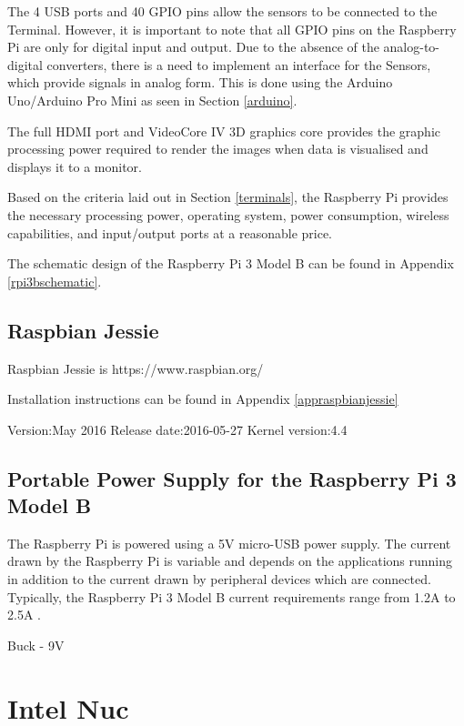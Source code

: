The 4 USB ports and 40 GPIO pins allow the sensors to be connected to the Terminal. However, it is important to note that all GPIO pins on the Raspberry Pi are only for digital input and output. Due to the absence of the analog-to-digital converters, there is a need to implement an interface for the Sensors, which provide signals in analog form. This is done using the Arduino Uno/Arduino Pro Mini as seen in Section \ref{arduino}. 

The full HDMI port and VideoCore IV 3D graphics core provides the graphic processing power required to render the images when data is visualised and displays it to a monitor. 

Based on the criteria laid out in Section \ref{terminals}, the Raspberry Pi provides the necessary processing power, operating system, power consumption, wireless capabilities, and input/output ports at a reasonable price. 

The schematic design of the Raspberry Pi 3 Model B can be found in Appendix \ref{rpi3bschematic}.

\cite{rpi3hardware}


\subsection{Raspbian Jessie}

Raspbian Jessie is 
\cite{rpi3raspbian}
https://www.raspbian.org/

Installation instructions can be found in Appendix \ref{appraspbianjessie}


Version:May 2016
Release date:2016-05-27
Kernel version:4.4


\subsection{Portable Power Supply for the Raspberry Pi 3 Model B}
\cite{rpi3faqs}

The Raspberry Pi is powered using a 5V micro-USB power supply\cite{rpi3faqs}. The current drawn by the Raspberry Pi is variable and depends on the applications running in addition to the current drawn by peripheral devices which are connected. Typically, the Raspberry Pi 3 Model B current requirements range from 1.2A to 2.5A \cite{rpi3faqs}. 

Buck - 9V

\section{Intel Nuc}

